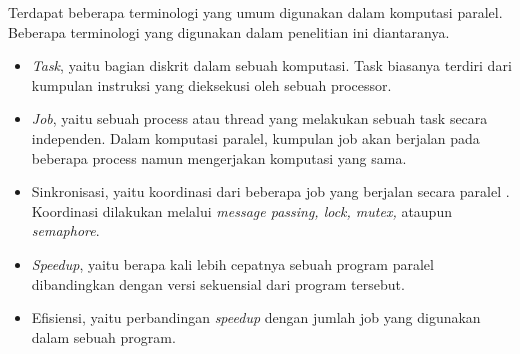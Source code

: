   Terdapat beberapa terminologi yang umum digunakan dalam komputasi paralel. Beberapa terminologi yang digunakan dalam penelitian ini diantaranya.
  \begin{itemize}
    \item \textit{Task}, yaitu bagian diskrit dalam sebuah komputasi. Task biasanya terdiri dari kumpulan instruksi yang dieksekusi oleh sebuah processor.  \citep{intro_parallel_llnl}
    \item \textit{Job}, yaitu sebuah process atau thread yang melakukan sebuah task secara independen. Dalam komputasi paralel, kumpulan job akan berjalan pada beberapa process namun mengerjakan komputasi yang sama. \citep{glossary_udel}
    \item Sinkronisasi, yaitu koordinasi dari beberapa job yang berjalan secara paralel \citep{intro_parallel_llnl}. Koordinasi dilakukan melalui \textit{message passing, lock, mutex,} ataupun \textit{semaphore}.
    \item \textit{Speedup}, yaitu berapa kali lebih cepatnya sebuah program paralel dibandingkan dengan versi sekuensial dari program tersebut. \citep{glossary_ufl}
    \item Efisiensi, yaitu perbandingan \textit{speedup} dengan jumlah job yang digunakan dalam sebuah program.

  \end{itemize}



